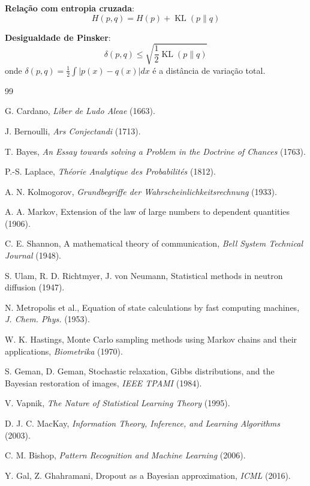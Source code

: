 \documentclass{tufte-handout}
\DeclareMathOperator{\KL}{KL}
\begin{document}
\textbf{Relação com entropia cruzada}:
\[
H(p, q) = H(p) + \KL(p \parallel q)
\]

\textbf{Desigualdade de Pinsker}:
\[
\delta(p, q) \le \sqrt{\frac{1}{2} \KL(p \parallel q)}
\]
onde $\delta(p, q) = \frac{1}{2} \int |p(x) - q(x)| dx$ é a distância de variação total.


\begin{thebibliography}{99}

 G. Cardano, \textit{Liber de Ludo Aleae} (1663).

 J. Bernoulli, \textit{Ars Conjectandi} (1713).

 T. Bayes, \textit{An Essay towards solving a Problem in the Doctrine of Chances} (1763).

 P.-S. Laplace, \textit{Théorie Analytique des Probabilités} (1812).

 A. N. Kolmogorov, \textit{Grundbegriffe der Wahrscheinlichkeitsrechnung} (1933).

 A. A. Markov, Extension of the law of large numbers to dependent quantities (1906).

 C. E. Shannon, A mathematical theory of communication, \textit{Bell System Technical Journal} (1948).

 S. Ulam, R. D. Richtmyer, J. von Neumann, Statistical methods in neutron diffusion (1947).

 N. Metropolis et al., Equation of state calculations by fast computing machines, \textit{J. Chem. Phys.} (1953).

 W. K. Hastings, Monte Carlo sampling methods using Markov chains and their applications, \textit{Biometrika} (1970).

 S. Geman, D. Geman, Stochastic relaxation, Gibbs distributions, and the Bayesian restoration of images, \textit{IEEE TPAMI} (1984).

 V. Vapnik, \textit{The Nature of Statistical Learning Theory} (1995).

 D. J. C. MacKay, \textit{Information Theory, Inference, and Learning Algorithms} (2003).

 C. M. Bishop, \textit{Pattern Recognition and Machine Learning} (2006).

 Y. Gal, Z. Ghahramani, Dropout as a Bayesian approximation, \textit{ICML} (2016).

\end{thebibliography}
\end{document}
